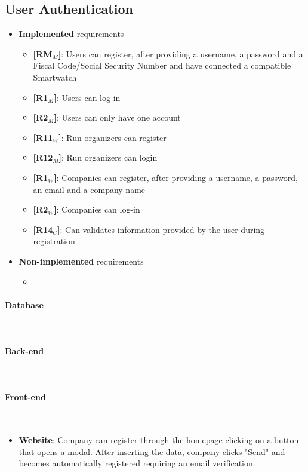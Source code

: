 \subsection{User Authentication}
\begin{itemize}
    \item \textbf{Implemented} requirements
        \begin{itemize}
   \item \textbf{[RM$_M$]}: Users can register, after providing a username, a password and a Fiscal Code/Social Security Number and have connected a compatible Smartwatch
    \item \textbf{[R1$_M$]}: Users can log-in
    \item \textbf{[R2$_M$]}: Users can only have one account 
    
  \item \textbf{[R11$_W$]}: Run organizers can register
    \item \textbf{[R12$_M$]}: Run organizers can login
    
    \item \textbf{[R1$_W$]}: Companies can register, after providing a username, a password, an email and a company name
    \item \textbf{[R2$_W$]}: Companies can log-in

    \item \textbf{[R14$_C$]}: Can validates information provided by the user during registration

        \end{itemize}
    \item \textbf{Non-implemented} requirements
    \begin{itemize}
            \item 
        \end{itemize}
\end{itemize}

\paragraph{Database} \mbox{}\\  \paragraph{Back-end} \mbox{}\\ 

\paragraph{Front-end} \mbox{}\\
\begin{itemize}
    \item \textbf{Website}: Company can register through the homepage clicking on a button that opens a modal. After inserting the data, company clicks "Send" and becomes automatically registered requiring an email verification.
\end{itemize}

